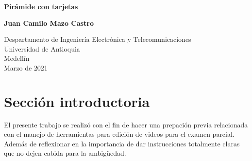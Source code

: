 \documentclass{article}
\begin{document}
\begin{titlepage}
    \begin{center}
        \vspace*{1cm}
            
        \Huge
        \textbf{Pirámide con tarjetas}
            
        \vspace{1cm}
        \LARGE
    
            
        \vspace{1.5cm}
            
        \textbf{Juan Camilo Mazo Castro}
            
        \vfill
            
        \vspace{0.8cm}
            
        \Large
        Despartamento de Ingeniería Electrónica y Telecomunicaciones\\
        Universidad de Antioquia\\
        Medellín\\
        Marzo de 2021
            
    \end{center}
\end{titlepage}

\tableofcontents
\newpage
\section{Sección introductoria}\label{intro}
El presente trabajo se realizó con el fin de hacer una prepación previa relacionada con el manejo de herramientas para edición de videos para el examen parcial. Además de reflexionar en la importancia de dar instrucciones totalmente claras que no dejen cabida para la ambigüedad. 
\end{document}
